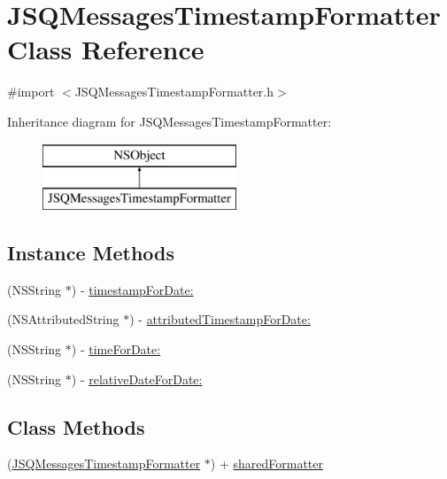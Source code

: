 \hypertarget{interface_j_s_q_messages_timestamp_formatter}{}\section{J\+S\+Q\+Messages\+Timestamp\+Formatter Class Reference}
\label{interface_j_s_q_messages_timestamp_formatter}


{\ttfamily \#import $<$J\+S\+Q\+Messages\+Timestamp\+Formatter.\+h$>$}

Inheritance diagram for J\+S\+Q\+Messages\+Timestamp\+Formatter\+:\begin{figure}[H]
\begin{center}
\leavevmode
\includegraphics[height=2.000000cm]{interface_j_s_q_messages_timestamp_formatter}
\end{center}
\end{figure}
\subsection*{Instance Methods}
\begin{DoxyCompactItemize}
\item 
(N\+S\+String $\ast$) -\/ \hyperlink{interface_j_s_q_messages_timestamp_formatter_ac202e49151e497e7a64ab4116d0e5b33}{timestamp\+For\+Date\+:}
\item 
(N\+S\+Attributed\+String $\ast$) -\/ \hyperlink{interface_j_s_q_messages_timestamp_formatter_a7168c60a0b787fcfad4cfc04b5ec1de9}{attributed\+Timestamp\+For\+Date\+:}
\item 
(N\+S\+String $\ast$) -\/ \hyperlink{interface_j_s_q_messages_timestamp_formatter_a965e1a293a62c8e33b04a49cdc39a4ad}{time\+For\+Date\+:}
\item 
(N\+S\+String $\ast$) -\/ \hyperlink{interface_j_s_q_messages_timestamp_formatter_ac7049a745f291ad7b2cf35491b61fa2d}{relative\+Date\+For\+Date\+:}
\end{DoxyCompactItemize}
\subsection*{Class Methods}
\begin{DoxyCompactItemize}
\item 
(\hyperlink{interface_j_s_q_messages_timestamp_formatter}{J\+S\+Q\+Messages\+Timestamp\+Formatter} $\ast$) + \hyperlink{interface_j_s_q_messages_timestamp_formatter_ac577ee6fe2be3fb072eb55acac86dc50}{shared\+Formatter}
\end{DoxyCompactItemize}
